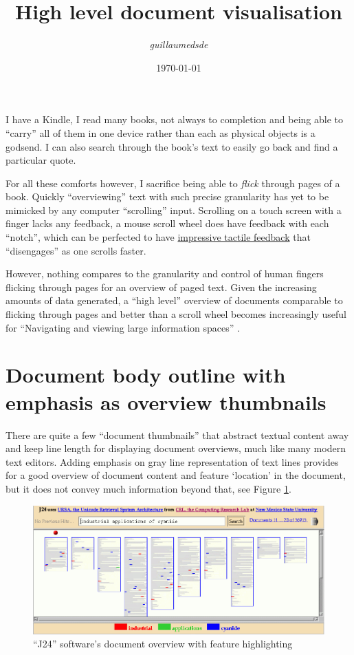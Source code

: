 \documentclass[12pt,a4paper,british]{report}
\title{\textbf{High level document visualisation}}
\author{\textit{guillaumedsde}}
\date{\today}
\begin{document}
\maketitle

I have a Kindle, I read many books, not always to completion and being able to ``carry'' all of them in one device rather than each as physical objects is a godsend. I can also search through the book's text to easily go back and find a particular quote.

For all these comforts however, I sacrifice being able to \textit{flick} through pages of a book. Quickly ``overviewing'' text with such precise granularity has yet to be mimicked by any computer ``scrolling'' input. Scrolling on a touch screen with a finger lacks any feedback, a mouse scroll wheel does have feedback with each ``notch'', which can be perfected to have \href{https://www.theverge.com/circuitbreaker/2019/10/29/20937114/logitech-mx-master-3-mouse-wheel-hardware-scroll-button}{impressive tactile feedback} that ``disengages'' as one scrolls faster.

However, nothing compares to the granularity and control of human fingers flicking through pages for an overview of paged text. Given the increasing amounts of data generated, a ``high level'' overview of documents comparable to flicking through pages and better than a scroll wheel becomes increasingly useful for ``Navigating and viewing large information spaces'' \autocite{bartramContinuousZoomConstrained1995}.

\section*{Document body outline with emphasis as overview thumbnails}

There are quite a few ``document thumbnails'' that abstract textual content away and keep line length for displaying document overviews, much like many modern text editors. Adding emphasis on gray line representation of text lines provides for a good overview of document content and feature `location' in the document, but it does not convey much information beyond that, see Figure \ref{fig:j24}.

\begin{figure}[H]
  \centering
  \includegraphics[width=\textwidth]{static/j24.png}
  \caption{``J24'' software's document overview with feature highlighting \\ \protect\autocite{ogdenDocumentThumbnailVisualizations1998a}}
  \label{fig:j24}
\end{figure}
\end{document}
